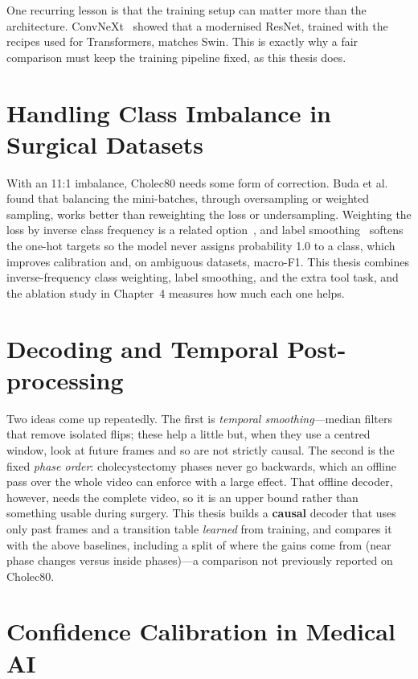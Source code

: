 \documentclass[11pt,a4paper]{report}
\begin{document}
One recurring lesson is that the training setup can matter more than the architecture. ConvNeXt~\cite{liu2022convnext} showed that a modernised ResNet, trained with the recipes used for Transformers, matches Swin. This is exactly why a fair comparison must keep the training pipeline fixed, as this thesis does.

\section{Handling Class Imbalance in Surgical Datasets}

With an 11:1 imbalance, Cholec80 needs some form of correction. Buda et al.~\cite{buda2018systematic} found that balancing the mini-batches, through oversampling or weighted sampling, works better than reweighting the loss or undersampling. Weighting the loss by inverse class frequency is a related option~\cite{cui2019classbalanced}, and label smoothing~\cite{szegedy2016rethinking} softens the one-hot targets so the model never assigns probability 1.0 to a class, which improves calibration and, on ambiguous datasets, macro-F1. This thesis combines inverse-frequency class weighting, label smoothing, and the extra tool task, and the ablation study in Chapter~4 measures how much each one helps.

\section{Decoding and Temporal Post-processing}

Two ideas come up repeatedly. The first is \emph{temporal smoothing}---median filters that remove isolated flips; these help a little but, when they use a centred window, look at future frames and so are not strictly causal. The second is the fixed \emph{phase order}: cholecystectomy phases never go backwards, which an offline pass over the whole video can enforce with a large effect. That offline decoder, however, needs the complete video, so it is an upper bound rather than something usable during surgery. This thesis builds a \textbf{causal} decoder that uses only past frames and a transition table \emph{learned} from training, and compares it with the above baselines, including a split of where the gains come from (near phase changes versus inside phases)---a comparison not previously reported on Cholec80.

\section{Confidence Calibration in Medical AI}
\end{document}
